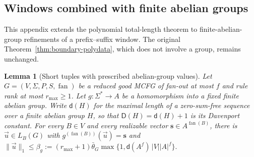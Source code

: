 \documentclass[11pt]{article}
\numberwithin{equation}{section}
\theoremstyle{plain}
\newtheorem{lemma}[theorem]{Lemma}
\theoremstyle{definition}
\theoremstyle{remark}
\newcommand{\tuple}[1]{\vec{#1}}
\newcommand{\fan}{\operatorname{fan}}
\theoremstyle{plain}
\begin{document}
\subsection{Windows combined with finite abelian groups}
\label{app:window-abelian}

This appendix extends the polynomial total-length theorem to
finite-abelian-group refinements of a prefix--suffix window.
The original Theorem~\ref{thm:boundary-polydata},
which does not involve a group, remains unchanged.

\begin{lemma}[Short tuples with prescribed abelian-group values]
\label{lem:group-typed-shortest}
Let $G=(V,\Sigma,P,S,\fan)$ be a reduced good
MCFG of fan-out at most $f$ and rule rank at most
$r_{\max}\ge1$. Let
$g:\Sigma^*\to A$ be a homomorphism into a fixed
finite abelian group. Write $\mathsf d(H)$ for the
maximal length of a zero-sum-free sequence over a
finite abelian group $H$, so that $\mathsf D(H)=\mathsf d(H)+1$
is its Davenport constant.
For every $B\in V$ and
every realizable vector
$\mathbf s\in A^{\fan(B)}$, there is
$\tuple u\in L_B(G)$ with
$g^{(\fan(B))}(\tuple u)=\mathbf s$
and
\(\|\tuple u\|_1\le\beta_g:= (r_{\max}+1)\bar\theta_G \max\{1,\mathsf d(A^f)\,|V||A|^f\}.\)
\end{lemma}
\end{document}
